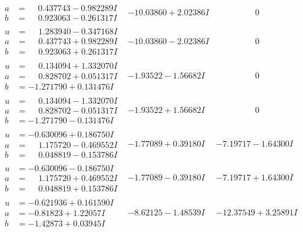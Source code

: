 \documentclass[1p]{elsarticle_modified}
\theoremstyle{definition}
\begin{document}
$$\begin{array}{c|c|c}
\begin{aligned}
a &= \phantom{-}0.437743 - 0.982289 I \\
b &= \phantom{-}0.923063 - 0.261317 I\end{aligned}
 & -10.03860 + 2.02386 I & \phantom{-0.000000 } 0 \\ \hline\begin{aligned}
u &= \phantom{-}1.283940 - 0.347168 I \\
a &= \phantom{-}0.437743 + 0.982289 I \\
b &= \phantom{-}0.923063 + 0.261317 I\end{aligned}
 & -10.03860 - 2.02386 I & \phantom{-0.000000 } 0 \\ \hline\begin{aligned}
u &= \phantom{-}0.134094 + 1.332070 I \\
a &= \phantom{-}0.828702 + 0.051317 I \\
b &= -1.271790 + 0.131476 I\end{aligned}
 & -1.93522 - 1.56682 I & \phantom{-0.000000 } 0 \\ \hline\begin{aligned}
u &= \phantom{-}0.134094 - 1.332070 I \\
a &= \phantom{-}0.828702 - 0.051317 I \\
b &= -1.271790 - 0.131476 I\end{aligned}
 & -1.93522 + 1.56682 I & \phantom{-0.000000 } 0 \\ \hline\begin{aligned}
u &= -0.630096 + 0.186750 I \\
a &= \phantom{-}1.175720 - 0.469552 I \\
b &= \phantom{-}0.048819 - 0.153786 I\end{aligned}
 & -1.77089 + 0.39180 I & -7.19717 - 1.64300 I \\ \hline\begin{aligned}
u &= -0.630096 - 0.186750 I \\
a &= \phantom{-}1.175720 + 0.469552 I \\
b &= \phantom{-}0.048819 + 0.153786 I\end{aligned}
 & -1.77089 - 0.39180 I & -7.19717 + 1.64300 I \\ \hline\begin{aligned}
u &= -0.621936 + 0.161590 I \\
a &= -0.81823 + 1.22057 I \\
b &= -1.42873 + 0.03945 I\end{aligned}
 & -8.62125 - 1.48539 I & -12.37549 + 3.25891 I \\ \hline\begin{aligned}

\end{aligned}
\end{array}$$
\end{document}
